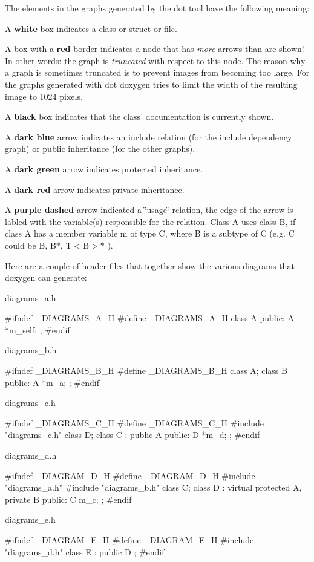 The elements in the graphs generated by the dot tool have the following meaning: 
\begin{DoxyItemize}
\item A {\bfseries white} box indicates a class or struct or file. 
\item A box with a {\bfseries red} border indicates a node that has {\itshape more\/} arrows than are shown! In other words: the graph is {\itshape truncated\/} with respect to this node. The reason why a graph is sometimes truncated is to prevent images from becoming too large. For the graphs generated with dot doxygen tries to limit the width of the resulting image to 1024 pixels. 
\item A {\bfseries black} box indicates that the class' documentation is currently shown. 
\item A {\bfseries dark blue} arrow indicates an include relation (for the include dependency graph) or public inheritance (for the other graphs). 
\item A {\bfseries dark green} arrow indicates protected inheritance. 
\item A {\bfseries dark red} arrow indicates private inheritance. 
\item A {\bfseries purple dashed} arrow indicated a \char`\"{}usage\char`\"{} relation, the edge of the arrow is labled with the variable(s) responsible for the relation. Class {\ttfamily A} uses class {\ttfamily B}, if class {\ttfamily A} has a member variable {\ttfamily m} of type C, where B is a subtype of C (e.g. C could be {\ttfamily B}, {\ttfamily B$\ast$}, {\ttfamily T$<$B$>$$\ast$} ). 
\end{DoxyItemize}

Here are a couple of header files that together show the various diagrams that doxygen can generate:

{\ttfamily diagrams\_\-a.h} 
\begin{DoxyVerbInclude}
#ifndef _DIAGRAMS_A_H
#define _DIAGRAMS_A_H
class A { public: A *m_self; };
#endif
\end{DoxyVerbInclude}
 {\ttfamily diagrams\_\-b.h} 
\begin{DoxyVerbInclude}
#ifndef _DIAGRAMS_B_H
#define _DIAGRAMS_B_H
class A;
class B { public: A *m_a; };
#endif
\end{DoxyVerbInclude}
 {\ttfamily diagrams\_\-c.h} 
\begin{DoxyVerbInclude}
#ifndef _DIAGRAMS_C_H
#define _DIAGRAMS_C_H
#include "diagrams_c.h"
class D;
class C : public A { public: D *m_d; };
#endif
\end{DoxyVerbInclude}
 {\ttfamily diagrams\_\-d.h} 
\begin{DoxyVerbInclude}
#ifndef _DIAGRAM_D_H
#define _DIAGRAM_D_H
#include "diagrams_a.h"
#include "diagrams_b.h"
class C;
class D : virtual protected  A, private B { public: C m_c; };
#endif
\end{DoxyVerbInclude}
 {\ttfamily diagrams\_\-e.h} 
\begin{DoxyVerbInclude}
#ifndef _DIAGRAM_E_H
#define _DIAGRAM_E_H
#include "diagrams_d.h"
class E : public D {};
#endif
\end{DoxyVerbInclude}




 